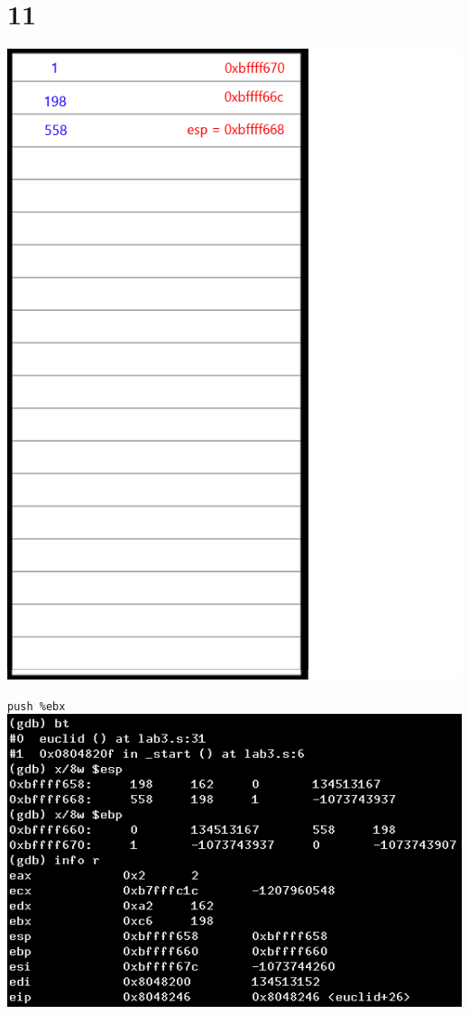 \documentclass{article}
\begin{document}
\section*{11}
\begin{minipage}{5cm}
\includegraphics[scale=0.3]{s3.png}
\end{minipage}
\begin{minipage}{8cm}
\verb|push %ebx|\\
\includegraphics[scale=0.4]{bxi15.png} \\
\end{minipage}
\clearpage
\end{document}
